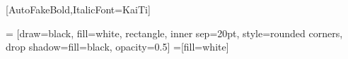 


\usepackage{setspace}  %
\usepackage{geometry}  %
\geometry{a4paper,left=3.0cm,right=3.0cm,top=2.25cm,bottom=2.0cm}

\usepackage{mathspec}
\setmainfont{Times New Roman}  %
[AutoFakeBold,ItalicFont=KaiTi]  %


\usepackage{tikz}
\usetikzlibrary{shapes,shadows}
 = [draw=black, fill=white, rectangle, 
inner sep=20pt, style=rounded corners, drop shadow={fill=black,
	opacity=0.5}]
 =[fill=white]

\newcommand{\boxabstract}[2][fill=white]{
	\begin{center}
		\begin{tikzpicture}
			\node [abstractbox, #1] (box)
			{\begin{minipage}{0.88\linewidth}
					\setlength{\parindent}{2mm}
					\small #2
			\end{minipage}};
			\node[abstracttitle, right=10pt] at (box.north west) {\textbf{摘要}};
		\end{tikzpicture}
	\end{center}
}
	
